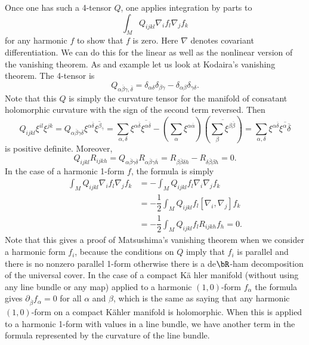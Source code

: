 Once one has such a 4-tensor $Q$, one applies integration by parts to
$$
\int_{M}Q_{ijkl}\nabla_{i}f_{l} \nabla_{j}f_{k}
$$
for any harmonic $f$ to show that $f$ is zero. Here $\nabla$ denotes covariant differentiation. We can do this for the linear as well as the nonlinear version of the vanishing theorem. As and example let us look at Kodaira's vanishing theorem. The 4-tensor is
$$
Q_{\alpha \overline{\beta} \gamma, \overline{\delta}}=\delta_{\alpha \delta}\delta_{\beta \gamma}-\delta_{\alpha \beta}\delta_{\gamma \delta}.
$$
Note that this $Q$ is simply the curvature tensor for the manifold of consatant holomorphic curvature with the sign of the second term reversed. Then
$$
Q_{ijkl}\xi^{il}\xi^{jk} = Q_{\alpha \overline{\beta}\gamma \overline{\delta}}\xi^{\alpha \overline{\delta}} \overline{\xi^{\beta_{\overline{\gamma}}}} = \sum\limits_{\alpha, \delta} \xi^{\alpha \overline{\delta}}\overline{\xi^{\alpha \overline{\delta}}} - \left(\sum\limits_{\alpha}\xi^{\alpha \overline{\alpha}}\right)\left(\overline{\sum\limits_{\beta}\xi^{\beta \overline{\beta}} }\right) = \sum\limits_{\alpha, \delta} \xi^{\alpha \overline{\delta}}\overline{\xi^{\alpha} \overline{\delta}}
$$
is positive definite. Moreover,
$$
Q_{ijkl}R_{ijkh} =Q_{\alpha \overline{\beta}\gamma \overline{\delta}}R_{\alpha \overline{\beta}\gamma \overline{h}}
= R_{\beta \overline{\beta}\delta h}-R_{\delta \overline{\beta}\beta h} = 0.
$$
In the case of a harmonic 1-form $f$, the formula is simply
\begin{align*}
\int_{M}Q_{ijkl}\nabla_{i}f_{l}\nabla_{j}f_{k} &= - \int_{M}Q_{ijkl}f_{l}\nabla_{i}\nabla_{j}f_{k}\\
&= -\dfrac{1}{2} \int_{M}Q_{ijkl}f_{l}\left[\nabla_{i}, \nabla_{j}\right]f_{k}\\
&= -\dfrac{1}{2} \int_{M}Q_{ijkl}f_{l}R_{ijkh}f_{h} = 0.
\end{align*}
Note that this gives a proof of Matsushima's vanishing theorem when we consider a harmonic form $f_{i}$, because the conditions on $Q$ imply that $f_{i}$ is parallel and there is no nonzero parallel 1-form otherwise there is a de$\bR$-ham decomposition of the universal cover. In the case of a compact K\"a hler manifold (without using any line bundle or any map) applied to a harmonic $(1,0)$-form $f_{\alpha}$ the formula gives $\partial_{\overline{\beta}}f_{\alpha} =0$ for all $\alpha$ and $\beta$, which is the same as saying that any harmonic $(1,0)$-form on a compact K\"ahler manifold is holomorphic. When this is applied to a harmonic 1-form with values in a line bundle, we have another term in the formula represented by the curvature of the line bundle.


